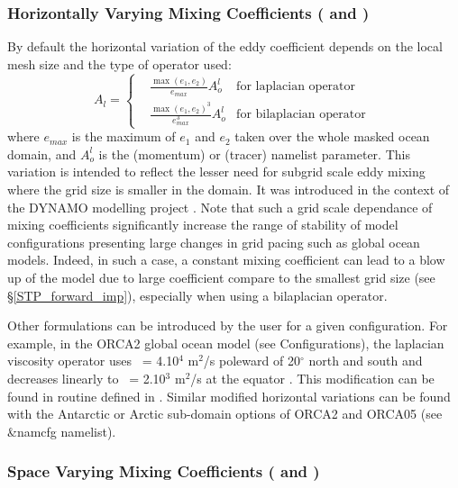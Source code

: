 \subsubsection{Horizontally Varying Mixing Coefficients ( and )}
By default the horizontal variation of the eddy coefficient depends on the local mesh 
size and the type of operator used:
\begin{equation} \label{Eq_title}
  A_l = \left\{     
   \begin{aligned}
         & \frac{\max(e_1,e_2)}{e_{max}} A_o^l  			& \text{for laplacian operator } \\
         & \frac{\max(e_1,e_2)^{3}}{e_{max}^{3}} A_o^l          & \text{for bilaplacian operator } 
   \end{aligned}    \right.
\end{equation}
where $e_{max}$ is the maximum of $e_1$ and $e_2$ taken over the whole masked 
ocean domain, and $A_o^l$ is the  (momentum) or  (tracer) 
namelist parameter. This variation is intended to reflect the lesser need for subgrid 
scale eddy mixing where the grid size is smaller in the domain. It was introduced in 
the context of the DYNAMO modelling project \citep{Willebrand_al_PO01}. 
Note that such a grid scale dependance of mixing coefficients significantly increase 
the range of stability of model configurations presenting large changes in grid pacing 
such as global ocean models. Indeed, in such a case, a constant mixing coefficient 
can lead to a blow up of the model due to large coefficient compare to the smallest 
grid size (see \S\ref{STP_forward_imp}), especially when using a bilaplacian operator.

Other formulations can be introduced by the user for a given configuration. 
For example, in the ORCA2 global ocean model (see Configurations), the laplacian 
viscosity operator uses ~= 4.10$^4$ m$^2$/s poleward of 20$^{\circ}$ 
north and south and decreases linearly to ~= 2.10$^3$ m$^2$/s 
at the equator \citep{Madec_al_JPO96, Delecluse_Madec_Bk00}. This modification 
can be found in routine  defined in . 
Similar modified horizontal variations can be found with the Antarctic or Arctic 
sub-domain options of ORCA2 and ORCA05 (see \&namcfg namelist).

\subsubsection{Space Varying Mixing Coefficients ( and )}

